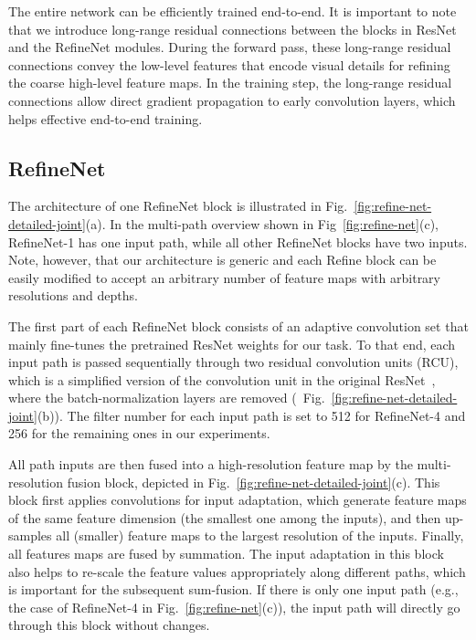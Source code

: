 \documentclass[10pt,twocolumn,letterpaper]{article}
\newcommand{\Fig}{Fig.\xspace}
\newcommand{\refOurFig}{\ref{fig:refine-net}(c)\xspace}
\begin{document}
The entire network can be efficiently trained end-to-end. It is important to note that we introduce long-range residual connections between the blocks in ResNet and the RefineNet modules.
During the forward pass, these long-range residual connections convey the low-level features that encode visual details for refining the coarse high-level feature maps.
In the training step, the long-range residual connections allow direct gradient propagation to early convolution layers, which helps effective end-to-end training. 

\subsection{RefineNet}\label{sec:refinet_details}

The architecture of one RefineNet block is illustrated in Fig.~\ref{fig:refine-net-detailed-joint}(a).
In the multi-path overview shown in Fig~\refOurFig,  
RefineNet-1 has one input path, while all other RefineNet blocks have two inputs. Note, however, that our architecture is generic and each Refine block can be easily modified to accept an arbitrary number of feature maps with arbitrary resolutions and depths.

The first part of each RefineNet block consists of an adaptive convolution set that  mainly fine-tunes the pretrained ResNet weights for our task. To that end, each input path is passed sequentially through two residual convolution units (RCU), which is a simplified version of the convolution unit in the original ResNet~\cite{He:2016:ResNet}, where the batch-normalization layers are removed (\cf~\Fig~\ref{fig:refine-net-detailed-joint}(b)). The filter number for each input path is set to 512  for \mbox{RefineNet-4} and 256 for the remaining ones in our experiments.

All path inputs are then fused into a high-resolution feature map by the multi-resolution fusion block, depicted in \Fig~\ref{fig:refine-net-detailed-joint}(c).
This block first applies convolutions for input adaptation, which generate feature maps of the same feature dimension (the smallest one among the inputs),
and then up-samples all (smaller) feature maps to the largest resolution of the inputs. Finally, all features maps are fused by summation.
The input adaptation in this block also helps to re-scale the feature values appropriately along different paths, which is important for the subsequent sum-fusion.
If there is only one input path (e.g., the case of RefineNet-4 in \Fig~\ref{fig:refine-net}(c)), the input path will directly go through this block without changes.
\end{document}
